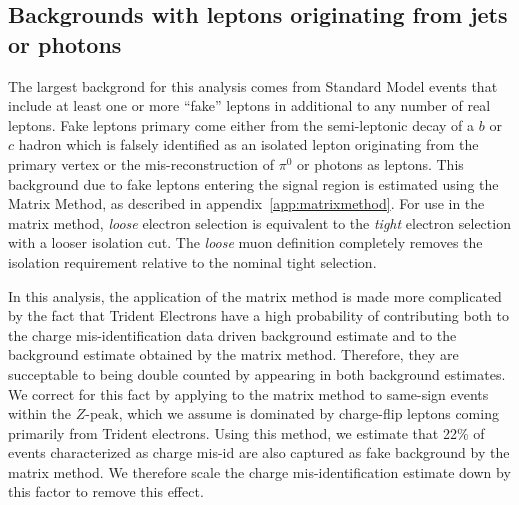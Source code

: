 \subsection{Backgrounds with leptons originating from jets or photons}\label{sect:fakes}

The largest backgrond for this analysis comes from Standard Model events that include at least one or more ``fake'' leptons in additional to any number of real leptons.
Fake leptons primary come either from the semi-leptonic decay of a $b$ or $c$ hadron which is falsely identified as an isolated lepton originating from the primary vertex or the mis-reconstruction of  $\pi^0$ or photons as leptons.
This background due to fake leptons entering the signal region is estimated using the Matrix Method, as described in appendix~\ref{app:matrixmethod}.
For use in the matrix method,  {\it loose} electron selection is equivalent to the {\it tight} 
electron selection with a looser isolation cut.
The {\it loose} muon definition completely removes the isolation requirement relative to the nominal tight selection.

In this analysis, the application of the matrix method is made more complicated by the fact that
Trident Electrons have a high probability of contributing both to the charge mis-identification data driven background estimate
and to the background estimate obtained by the matrix method.
Therefore, they are succeptable to being double counted by appearing in both background estimates.
We correct for this fact by applying to the matrix method to same-sign events within the $Z$-peak,
which we assume is dominated by charge-flip leptons coming primarily from Trident electrons.
Using this method, we estimate that 22\% of events characterized as charge mis-id are also
captured as fake background by the matrix method.
We therefore scale the charge mis-identification estimate down by this factor to remove this effect.


